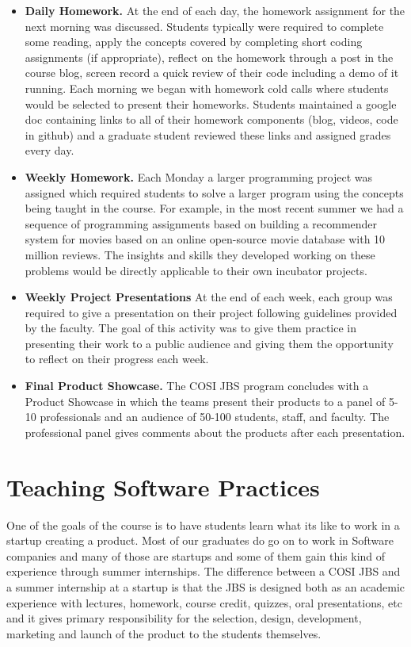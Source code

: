 \documentclass{sig-alternate}
\begin{document}
\begin{itemize}
\item {\bf Daily Homework.} At the end of each day, the homework assignment for the next morning was discussed. Students typically were required to complete some reading, apply the concepts covered by completing short coding assignments (if appropriate), reflect on the homework through a post in the course blog, screen record a quick review of their code including a demo of it running. Each morning we began with homework cold calls where students would be selected to present their homeworks. Students maintained a google doc containing links to all of their homework components (blog, videos, code in github) and a graduate student reviewed these links and assigned grades every day.
\item{\bf Weekly Homework.} Each Monday a larger programming project was assigned which required students to solve a larger program using the concepts being taught in the course. For example, in the most recent summer we had a sequence of programming assignments based on building a recommender system for movies based on an online open-source movie database with 10 million reviews. The insights and skills they developed working on these problems would be directly applicable to their own incubator projects.
\item{\bf Weekly Project Presentations} At the end of each week, each group was required to give a presentation on their project following guidelines provided by the faculty. The goal of this activity was to give them practice in presenting their work to a public audience and giving them the opportunity to reflect on their progress each week.
\item{\bf Final Product Showcase.} The COSI JBS program concludes with a Product Showcase in which the teams present their products to a panel of 5-10 professionals and an audience of 50-100 students, staff, and faculty.  The professional panel gives comments about the products after each presentation. 
\end{itemize}


\section{ Teaching Software Practices}
One of the goals of the course is to have students learn what its like to work in a startup creating a product. Most of our graduates do go on to work in Software companies and many of those are startups and some of them gain this kind of experience through summer internships.  The difference between a COSI JBS and a summer internship at a startup is that the JBS is designed both as an academic experience with lectures, homework, course credit, quizzes, oral presentations, etc and it gives primary responsibility for the selection, design, development, marketing and launch of the product to the students themselves. 
\end{document}
